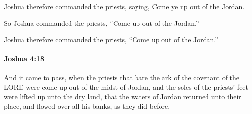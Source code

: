 			\begin{versebox}
					\item[BHS] 
					\item[ASV] Joshua therefore commanded the priests, saying, Come ye up out of the Jordan.
					\item[NIV] So Joshua commanded the priests, “Come up out of the Jordan.”
					\item[NRSV] Joshua therefore commanded the priests, “Come up out of the Jordan.”
			\end{versebox}

		\paragraph{Joshua 4:18} %
			\label{JOSHUA-4-18}

			And it came to pass, when the priests that bare the ark of the covenant of the LORD were come up out of the midst of Jordan, and the soles of the priests’ feet were lifted up unto the dry land, that the waters of Jordan returned unto their place, and flowed over all his banks, as they did before.

